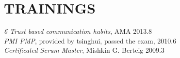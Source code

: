 
\section{TRAININGS}

{\em 6 Trust based communication habits}, AMA \hfill 2013.8
\\
{\em PMI PMP}, provided by tsinghui, passed the exam, \hfill 2010.6
\\
{\em Certificated Scrum Master}, Mishkin G. Berteig \hfill 2009.3

